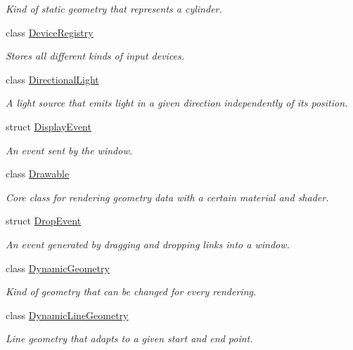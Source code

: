 \begin{DoxyCompactItemize}
\begin{DoxyCompactList}\small\item\em Kind of static geometry that represents a cylinder. \end{DoxyCompactList}\item 
class \mbox{\hyperlink{classec_1_1_device_registry}{Device\+Registry}}
\begin{DoxyCompactList}\small\item\em Stores all different kinds of input devices. \end{DoxyCompactList}\item 
class \mbox{\hyperlink{classec_1_1_directional_light}{Directional\+Light}}
\begin{DoxyCompactList}\small\item\em A light source that emits light in a given direction independently of its position. \end{DoxyCompactList}\item 
struct \mbox{\hyperlink{structec_1_1_display_event}{Display\+Event}}
\begin{DoxyCompactList}\small\item\em An event sent by the window. \end{DoxyCompactList}\item 
class \mbox{\hyperlink{classec_1_1_drawable}{Drawable}}
\begin{DoxyCompactList}\small\item\em Core class for rendering geometry data with a certain material and shader. \end{DoxyCompactList}\item 
struct \mbox{\hyperlink{structec_1_1_drop_event}{Drop\+Event}}
\begin{DoxyCompactList}\small\item\em An event generated by dragging and dropping links into a window. \end{DoxyCompactList}\item 
class \mbox{\hyperlink{classec_1_1_dynamic_geometry}{Dynamic\+Geometry}}
\begin{DoxyCompactList}\small\item\em Kind of geometry that can be changed for every rendering. \end{DoxyCompactList}\item 
class \mbox{\hyperlink{classec_1_1_dynamic_line_geometry}{Dynamic\+Line\+Geometry}}
\begin{DoxyCompactList}\small\item\em Line geometry that adapts to a given start and end point. \end{DoxyCompactList}\item 

\end{DoxyCompactItemize}
